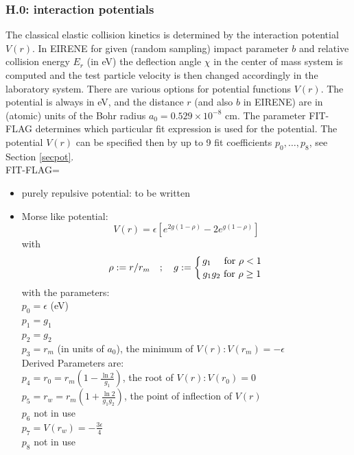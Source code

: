 \documentclass[12pt,dvips]{article}
\begin{document}
\subsubsection*{H.0: interaction potentials}\label{sec1.3.0}
The classical elastic collision kinetics is determined by the
interaction potential $V(r)$. In EIRENE for given (random sampling)
impact parameter $b$ and relative collision energy $E_r$ (in eV) the
deflection angle $\chi$ in the center of mass system is computed and
the test particle velocity is then changed accordingly in the
laboratory system. There are various options for potential functions
$V(r)$. The potential is always in eV, and the distance $r$ (and
also $b$ in EIRENE) are in (atomic) units of the Bohr radius
$a_0=0.529 \times 10^{-8}$ cm. The parameter FIT-FLAG determines
which particular fit expression is used for the potential. The
potential $V(r)$ can be specified then by up
to 9 fit coefficients $p_0,\dots,p_8$, see Section \ref{secpot}.\\

FIT-FLAG=
\begin{itemize}
\item [=1]
purely repulsive potential: to be written
\item [=2]
Morse like potential:\\
\begin{equation}\nonumber
V(r) = \epsilon \left[e^{2g(1-\rho)}-2 e^{g(1-\rho)}\right]
\end{equation}
with
\begin{equation}
 \rho:= r/r_m \quad; \quad g:=\left\{ {g_1  \ \  \ \ \mbox{for} \ \rho < 1 \atop g_1g_2
\ \mbox{for} \
 \rho \geq 1} \right.
\end{equation}
with the parameters:\\  $p_0=\epsilon$ (eV)\\ $p_1=g_1$\\ $p_2=g_2
$\\ $p_3=r_m $ (in units of $a_0$), the minimum of $V(r): V(r_m)=-\epsilon$\\
Derived Parameters are: \\
$p_4=r_0=r_m\left(1-\frac{\ln 2}{g_1}\right)$, the root of $V(r):
V(r_0)=0$\\
$p_5=r_w=r_m\left(1+\frac{\ln 2}{g_1g_2}\right)$, the point of
inflection of $V(r)$\\
$p_6$  not in use\\
$p_7  = V(r_w)=-\frac{3\epsilon}{4}$ \\
$p_8$  not in use
\end{itemize}
\end{document}
